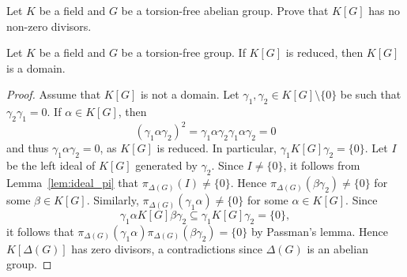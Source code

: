 \begin{exercise}
    Let $K$ be a field and $G$ be a torsion-free abelian group. Prove that 
    $K[G]$ has no non-zero divisors. 
\end{exercise}


\begin{theorem}[Passman]
\label{thm:Passman}
	Let $K$ be a field and $G$ be a torsion-free group. If 
	$K[G]$ is reduced, then $K[G]$ is a domain.
\end{theorem}

\begin{proof}
	Assume that $K[G]$ is not a domain. Let $\gamma_1,\gamma_2\in K[G]\setminus\{0\}$
	be such that $\gamma_2\gamma_1=0$. If $\alpha\in K[G]$, then
	\[
		(\gamma_1\alpha\gamma_2)^2=\gamma_1\alpha\gamma_2\gamma_1\alpha\gamma_2=0
	\]
	and thus $\gamma_1\alpha\gamma_2=0$, as $K[G]$ is reduced. In particular, 
	$\gamma_1K[G]\gamma_2=\{0\}$. Let $I$ be the left ideal of $K[G]$ generated 
	by $\gamma_2$. Since $I\ne\{0\}$, it follows
	from Lemma~\ref{lem:ideal_pi} that 
	$\pi_{\Delta(G)}(I)\ne\{0\}$. Hence 
	$\pi_{\Delta(G)}(\beta\gamma_2)\ne\{ 0\}$ for some $\beta\in K[G]$. 
	Similarly, 
	$\pi_{\Delta(G)}(\gamma_1\alpha)\ne\{ 0\}$ for some $\alpha\in K[G]$. Since 
	\[
		\gamma_1\alpha K[G]\beta\gamma_2\subseteq \gamma_1 K[G]\gamma_2=\{0\},
	\]
    it follows that $\pi_{\Delta(G)}(\gamma_1\alpha)\pi_{\Delta(G)}(\beta\gamma_2)=\{0\}$
    by Passman's lemma. Hence $K[\Delta(G)]$ has zero divisors, a contradictions
    since $\Delta(G)$ is an abelian group.
\end{proof}



